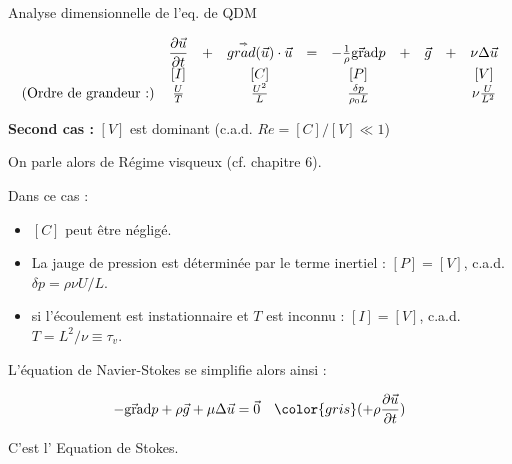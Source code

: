 \begin{frame}{Analyse dimensionnelle de l'eq. de QDM} 
\small

$$ 
\begin{array}{lccccccccc} 
\displaystyle
 &
\displaystyle \frac{\partial \vec{u}}{\partial t} & + &  \accentset{\Rightarrow}{grad} (\vec{u}) \cdot \vec{u} 
&=& 
 - \frac{1}{\rho}  \vec{\mbox{\rm gra}}\mbox{\rm d} p &+& \vec{g}  &+ & \nu \Delta \vec{u} 
 \\
\displaystyle
&
\left[I\right] && \left[ C \right] && \left[P\right]  && &&\left[V\right] 
\\
\displaystyle
\mbox{(Ordre de grandeur :)} &
\frac{U}{T}  && \frac{U^2}{L} && \frac{\delta p }{\rho_0 L} && && \nu \frac{U}{L^2}
\end{array}
$$


\pause
\bigskip


{\bf Second cas :} $[V]$ est dominant (c.a.d. $Re = [C]/[V] \ll 1$) 
\pause
\smallskip

On parle alors de {\color{rouge} Régime visqueux} (cf. chapitre 6). 

\pause 
\medskip

Dans ce cas :

\begin{itemize}
\item $[C]$ peut être négligé.

\item La jauge de pression est déterminée par le terme inertiel : $[P] = [V]$, c.a.d. $\delta p = \rho \nu U/L$.  

\item {\color{gris} si l'écoulement est instationnaire et $T$ est inconnu :  $[I] = [V]$, c.a.d. $T = L^2/\nu \equiv \tau_v$}.  

\end{itemize}

L'équation de Navier-Stokes se simplifie alors ainsi :

$$ 
 - \gradient p + \rho \vec{g}  + \mu \Delta \myvec{u} = \vec{0} \quad {\color{gris} ( + \rho \dpdt{\myvec{u}})} 
$$

\smallskip
 
C'est l'{\color{red} Equation de Stokes}.


\end{frame}



